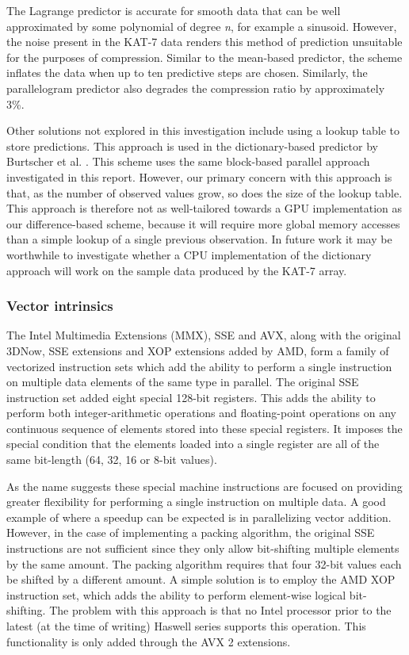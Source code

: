   The Lagrange predictor is accurate for smooth data that can be well approximated by some polynomial of degree \textit{n}, for example a sinusoid. However, the noise present in the KAT-7 data renders this
  method of prediction unsuitable for the purposes of compression. Similar to the mean-based predictor, the scheme inflates the data when up to ten predictive steps are chosen. Similarly, the parallelogram predictor 
  also degrades the compression ratio by approximately 3\%.
  
  Other solutions not explored in this investigation include using a lookup table to store predictions. This approach is used in the dictionary-based predictor by Burtscher et al. \cite{4589203,4976448}.
  This scheme uses the same block-based parallel approach investigated in this report. However, our primary concern with this approach is that, as the number of observed values grow, so does the size of the lookup table. 
  This approach is therefore not as well-tailored towards a GPU implementation as our difference-based scheme, because it will require more global memory accesses than a 
  simple lookup of a single previous observation. In future work it may be worthwhile to investigate whether a CPU implementation of the dictionary approach will work on the sample 
  data produced by the KAT-7 array.
  \subsubsection{Vector intrinsics}
  The Intel Multimedia Extensions (MMX), SSE and AVX, along with the original 3DNow, SSE extensions and XOP extensions added by AMD, form a family of vectorized instruction sets which add the ability to 
  perform a single instruction on multiple data elements of the same type in parallel. The original SSE instruction set added eight special 128-bit registers. This adds 
  the ability to perform both integer-arithmetic operations and floating-point operations on any continuous sequence of elements stored into these special registers. It imposes the special condition that the 
  elements loaded into a single register are all of the same bit-length (64, 32, 16 or 8-bit values).
  
  As the name suggests these special machine instructions are focused on providing greater flexibility for performing a single instruction on multiple data. A good example of where
  a speedup can be expected is in parallelizing vector addition. However, in the case of implementing a packing algorithm, the original SSE instructions are not sufficient since they only allow 
  bit-shifting multiple elements by the same amount. The packing algorithm requires that four 32-bit values each be shifted by a different amount. A simple solution is to employ the AMD XOP 
  instruction set, which adds the ability to perform element-wise logical bit-shifting. The problem with this approach is that no Intel processor prior to the latest (at the time of writing) 
  Haswell series supports this operation. This functionality is only added through the AVX 2 extensions.
  
